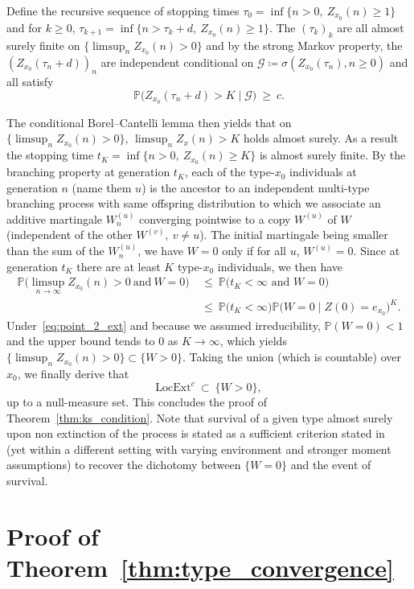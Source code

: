 \begin{refsegment}
Define the recursive sequence of stopping times $\tau_0=\inf\{n>0,\ Z_{x_0}(n)\geq 1\}$ and for $k\geq 0$,  $\tau_{k+1}=\inf\{n>\tau_k+d,\ Z_{x_0}(n) \geq 1\}$.
The $(\tau_k)_k$ are all almost surely finite on $\{\limsup_{n}Z_{x_0}(n)>0\}$ and by the strong Markov property, the $(Z_{x_0}(\tau_n+d))_n$ are independent conditional on $\mathcal{G}\coloneqq\sigma(Z_{x_0}(\tau_n), n\geq 0)$ and all satisfy
\[
 \mathbb{P}\big(Z_{x_0}(\tau_n+d) > K \mid \mathcal{G}\big)\ \geq\ c.
\]

The conditional Borel--Cantelli lemma then yields that on $\{\limsup_{n}Z_{x_0}(n)>0\}$, $\limsup_n Z_x(n)>K$ holds almost surely. As a result the stopping time $t_K=\inf\{n>0,\ Z_{x_0}(n)\geq K\}$ is almost surely finite. By the branching property at generation $t_K$, each of the type-$x_0$ individuals at generation $n$ (name them $u$) is the ancestor to an independent multi-type branching process with same offspring distribution to which we associate an additive martingale $W_n^{(u)}$ converging pointwise to a copy $W^{(u)}$ of $W$ (independent of the other $W^{(v)},\ v\neq u$).
The initial martingale being smaller than the sum of the $W_n^{(u)}$, we have $W=0$ only if for all $u$, $W^{(u)}=0$.
Since at generation $t_K$ there are at least $K$ type-$x_0$ individuals, we then have
\begin{align*}
  \mathbb{P}\Big(\limsup_{n\to\infty}Z_{x_0}(n)>0\ \text{and}\ W=0\Big)\ &\leq \ \mathbb{P}\big(t_K <\infty \text{ and }W=0\big)\\
  &\leq\ \mathbb{P}\big(t_K <\infty) \mathbb{P}\big(W=0 \mid Z(0)= e_{x_0}\big)^K.
\end{align*}
Under~\ref{eq:point_2_ext} and because we assumed irreducibility, $\mathbb{P}(W=0)<1$ and
the upper bound tends to $0$ as $K\to \infty$, which yields $\{\limsup_{n}Z_{x_0}(n)>0\}\subset \{W>0\}$. Taking the union (which is countable) over $x_0$, we finally derive that
\[
  \mathrm{LocExt}^c \ \subset\ \{W>0\},
\]
up to a null-measure set.
This concludes the proof of Theorem~\ref{thm:ks_condition}.
Note that survival of a given type almost surely upon non extinction of the process is stated as a sufficient criterion stated in~\cite{ligonniere_kesten_2024}  (yet within a different setting with varying environment and stronger moment assumptions) to recover the dichotomy between $\{W=0\}$ and the event of survival.


\section{Proof of Theorem~\ref{thm:type_convergence}}\label{ch2_sec:proof_type_convergence}


\end{refsegment}

